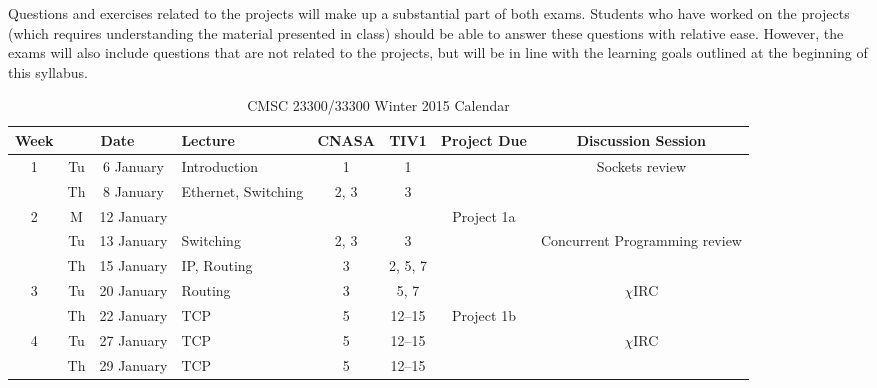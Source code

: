 \documentclass[11pt]{article}
\newcommand{\chirc}{$\chi$\textsf{IRC}}
\begin{document}
Questions and exercises related to the projects will make up a substantial part of both exams. Students who have worked on the projects (which requires understanding the material presented in class) should be able to answer these questions with relative ease. However, the exams will also include questions that are not related to the projects, but will be in line with the learning goals outlined at the beginning of this syllabus.


\begin{sidewaystable}
\sffamily\small
\setlength{\extrarowheight}{4pt}
\caption{CMSC 23300/33300 Winter 2015 Calendar}
\begin{tabular}{|c|cc||p{6cm}|c|c|c|c|}
\hline
\textbf{Week} &  \multicolumn{2}{|c||}{\textbf{Date}} & \textbf{Lecture} & \textbf{CNASA} & \textbf{TIV1} & \textbf{Project Due} & \textbf{Discussion Session} \\\hline

\multirow{2}{*}{1}  & Tu & 6 January    & Introduction                                    & 1    & 1       & \cellcolor[gray]{0.9}  & Sockets review \\\cline{2-6}
                    & Th & 8 January    & Ethernet, Switching                             & 2, 3 & 3       & \cellcolor[gray]{0.9}  & \cellcolor[gray]{0.9} \\\hline\hline

\multirow{3}{*}{2}  & M  & 12 January   & \cellcolor[gray]{0.9}  & \cellcolor[gray]{0.9}   & \cellcolor[gray]{0.9}  & Project 1a  & \cellcolor[gray]{0.9} \\\cline{2-6}
                    & Tu & 13 January   & Switching                                       & 2, 3 & 3       & \cellcolor[gray]{0.9}  & Concurrent Programming review\\\cline{2-6}
                    & Th & 15 January   & IP, Routing                                     & 3    & 2, 5, 7  & \cellcolor[gray]{0.9}  & \cellcolor[gray]{0.9} \\\hline\hline

\multirow{2}{*}{3}  & Tu & 20 January   & Routing                                         & 3    & 5, 7    & \cellcolor[gray]{0.9}  & \chirc \\\cline{2-6}
                    & Th & 22 January   & TCP                                             & 5    & 12--15  & Project 1b  & \cellcolor[gray]{0.9} \\\hline\hline

\multirow{2}{*}{4}  & Tu & 27 January   & TCP                                             & 5    & 12--15  & \cellcolor[gray]{0.9}  & \chirc \\\cline{2-6}
                    & Th & 29 January   & TCP                                             & 5    & 12--15  & \cellcolor[gray]{0.9}  & \cellcolor[gray]{0.9} \\\hline\hline


\end{tabular}
\end{sidewaystable}
\end{document}
